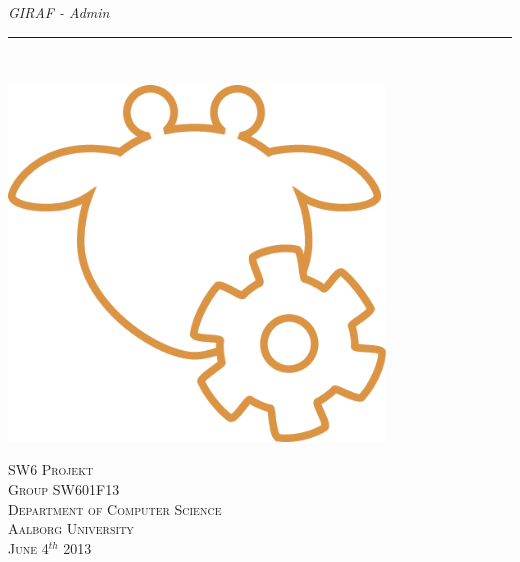 
\thispagestyle{empty}
\begin{flushright}
\vspace{3cm}

\phantom{hul}

\phantom{hul}

\phantom{hul}

\textsl{\Huge GIRAF - Admin} \\ \vspace{1cm}

\rule{13cm}{3mm} \\ \vspace{1.5cm}
\vspace{1cm}

\includegraphics[width=0.75\textwidth]{images/girafAdminLogo.png}

\vspace{1.5cm} 
\textsc{\Large SW6 Projekt \\
Group SW601F13 \\
Department of Computer Science\\
Aalborg University\\
June 4$^{th}$ 2013\\}
\end{flushright}
